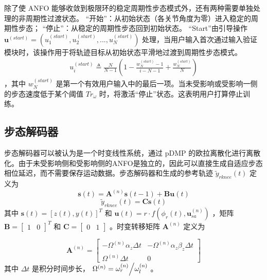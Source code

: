 除了使 ANFO 能够收敛到极限环的稳定周期性步态模式外，还有两种需要单独处理的非周期性过渡状态。 “开始”：从初始状态（各关节角度为零）进入稳定的周期性步态； “停止”：从稳定的周期性步态回到初始状态。 “Start”由引导操作    ${\pmb{u}^{(start)}} = ({u}_1^{(start)},{u}_2^{(start)},...,{u}_N^{(start)})$    处理，当用户输入首次通过输入验证模块时，该操作用于将轨迹目标从初始状态平滑地过渡到周期性步态模式。
    \begin{equation}
  \label{deqn_ex18}
  \begin{array}{*{20}{c}}
    {{u}_i^{(start)} \triangleq \frac{N}{{N - 1}}\left( {1 - \frac{{w_N^{(start)} - 1}}{{i - N-1}} + \frac{{w_N^{(start)}}}{N}} \right)} 
  \end{array}
\end{equation}   ，其中    $w_N^{(start)}$    是第一个有效用户输入中的最后一项。当未受影响或受影响一侧的步态速度低于某个阈值    $T{r_\omega }$    时，将激活“停止”状态。这表明用户打算停止训练。  

   \subsection{步态解码器  }    步态解码器可以被认为是一个时变线性系统，通过 pDMP 的欧拉离散化进行离散化。由于未受影响侧和受影响侧的ANFO是独立的，因此可以直接生成自适应步态相位延迟，而不需要保存运动数据。步态解码器和生成的参考轨迹    ${{\tilde y}_{rknee}}(t)$    定义为
    \begin{equation}
  \label{deqn_ex19}
  \pmb{s}(t) = {{\boldsymbol{A}}^{(n)}}\pmb{s}(t - 1) + {\boldsymbol{B}}\pmb{u}(t)
\end{equation}   
    \begin{equation}
  \label{deqn_ex20}
  {{\tilde y}_{rknee}}(t) = {\boldsymbol{C}}\pmb{s}(t)
\end{equation}    其中    $\pmb{s}(t)={\left[ {z(t),y(t)} \right]^T}$    和    ${\pmb{u}}(t)=r \cdot f({\phi _r}(t),{\pmb{u}}_{sa}^{(n)})$    ，矩阵    ${\boldsymbol{B}={\left[ {\begin{array}{*{20}{c}}1&0 \end{array}} \right]^T}}$    和    ${\boldsymbol{C}=\left[{\begin{array}{*{20}{c}}0&1 \end{array}} \right]}$    。时变转移矩阵    ${{\boldsymbol{A}}^{(n)}}$    定义为  

   \[{{\boldsymbol{A}}^{(n)}} = \left[ {\begin{array}{*{20}{c}}
  { - {\Omega ^{(n)}}{\alpha _z}\Delta t}&{ - {\Omega ^{(n)}}{\alpha _z}{\beta _z}\Delta t}  \\  
  {{\Omega ^{(n)}}\Delta t}&0 
\end{array}} \right]\]    其中    $\Delta t$    是积分时间步长，    ${\Omega ^{(n)}} = {{\omega _r^{(n)}} \mathord{\left/
{\vphantom {{\omega _r^{(n)}} {\omega _l^{(n)}}}} \right.
\kern-\nulldelimiterspace} {\omega _l^{(n)}}}$ 。


